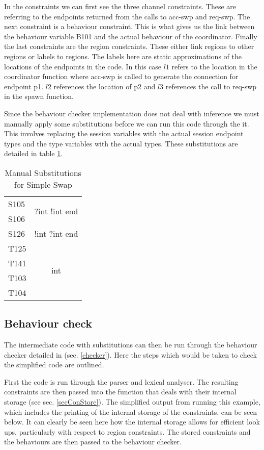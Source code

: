 In the constraints we can first see the three channel constraints. These are referring to the endpoints returned from the calls to acc-swp and req-swp. The next constraint is a behaviour constraint. This is what gives us the link between the behaviour variable B101 and the actual behaviour of the coordinator. Finally the last constraints are the region constraints. These either link regions to other regions or labels to regions. The labels here are static approximations of the locations of the endpoints in the code. In this case $l1$ refers to the location in the coordinator function where acc-swp is called to generate the connection for endpoint p1. $l2$ references the location of p2 and $l3$ references the call to req-swp in the spawn function. 

Since the behaviour checker implementation does not deal with inference we must manually apply some substitutions before we can run this code through the it. This involves replacing the session variables with the actual session endpoint types and the type variables with the actual types. These substitutions are detailed in table \ref{subs}. 

\begin{table}
\centering
\begin{tabular}{l |c}
S105 & \multirow{2}{*}{?int !int end} \\
S106 & \\ 
S126 & !int ?int end \\ 
T125 & \multirow{4}{*}{int} \\
T141 & \\ 
T103 & \\
T104 & \\ 
\end{tabular}
\caption{Manual Substitutions for Simple Swap}
\label{subs}
\end{table}

\subsection{Behaviour check}

The intermediate code with substitutions can then be run through the behaviour checker detailed in (sec. \ref{checker}). Here the steps which would be taken to check the simplified code are outlined. 

First the code is run through the parser and lexical analyser. The resulting constraints are then passed into the function that deals with their internal storage (see sec. \ref{secConStore}). The simplified output from running this example, which includes the printing of the internal storage of the constraints, can be seen below. It can clearly be seen here how the internal storage allows for efficient look ups, particularly with respect to region constraints. The stored constraints and the behaviours are then passed to the behaviour checker. 

